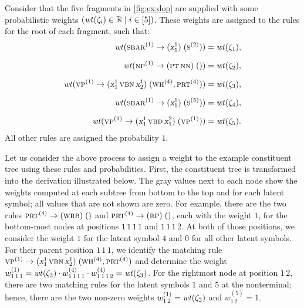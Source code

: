 \documentclass[../../document.tex]{subfiles}
\begin{document}
\begin{example}
        Consider that the five fragments in \cref{fig:ex:dop} are supplied with some probabilistic weights \((\mathit{wt}(\zeta_i) \in \mathbb{R} \mid i \in [5])\).
        These weights are assigned to the  rules for the root of each fragment, such that:
        \begin{align*}
            \mathit{wt}(\textsc{sbar}^{(1)} \to (\textsl{x}^1_1)\;(\textsc{s}^{(2)})) &= \mathit{wt}(\zeta_1), \\[.2cm]
            \mathit{wt}(\textsc{np}^{(1)} \to (\textsc{pt}\,\textsc{nn})\;()) &= \mathit{wt}(\zeta_2), \\[.2cm]
            \mathit{wt}(\textsc{vp}^{(1)} \to (\textsl{x}_1^1\,\textsc{vbn}\,\textsl{x}_2^1)\;(\textsc{wh}^{(4)}, \textsc{prt}^{(4)})) &= \mathit{wt}(\zeta_3), \\[.2cm]
            \mathit{wt}(\textsc{sbar}^{(1)} \to (\textsl{x}^1_1)\;(\textsc{s}^{(5)})) &= \mathit{wt}(\zeta_4),  \\[.2cm]
            \mathit{wt}(\textsc{vp}^{(1)} \to (\textsl{x}^1_1\,\textsc{vbd}\,\textsl{x}_1^2)\;(\textsc{vp}^{(1)})) &= \mathit{wt}(\zeta_5) \text{.}
        \end{align*}
        All other rules are assigned the probability \(1\).

        Let us consider the above process to assign a weight to the example constituent tree using these rules and probabilities.
        First, the constituent tree is transformed into the derivation illustrated below.
        The gray values next to each node show the weights computed at each subtree from bottom to the top and for each latent symbol; all values that are not shown are zero.
        For example, there are the two rules \(\textsc{prt}^{(4)} \to (\textsc{wrb})\;()\) and  \(\textsc{prt}^{(4)} \to (\textsc{rp})\;()\), each with the weight \(1\), for the bottom-most nodes at positions \(1\,1\,1\,1\) and \(1\,1\,1\,2\).
        At both of those positions, we consider the weight \(1\) for the latent symbol \(4\) and \(0\) for all other latent symbols.
        For their parent position \(1\,1\,1\), we identify the matching rule \(\textsc{vp}^{(1)} \to (\textsl{x}_1^1\,\textsc{vbn}\,\textsl{x}_2^1)\;(\textsc{wh}^{(4)}, \textsc{prt}^{(4)})\) and determine the weight \(w_{1\,1\,1}^{(1)} = \mathit{wt}(\zeta_3) \cdot w_{1\,1\,1\,1}^{(4)} \cdot w_{1\,1\,1\,2}^{(4)} = \mathit{wt}(\zeta_3)\).
        For the rightmost node at position \(1\,2\), there are two matching rules for the latent symbols \(1\) and \(5\) at the  nonterminal; hence, there are the two non-zero weights \(w_{1\,2}^{(1)} = \mathit{wt}(\zeta_2)\) and \(w_{1\,2}^{(5)} = 1\).

        \vspace{.5cm}

        \null\hfill{}
        
        \hfill\exampleqed

    \end{example}
\end{document}
